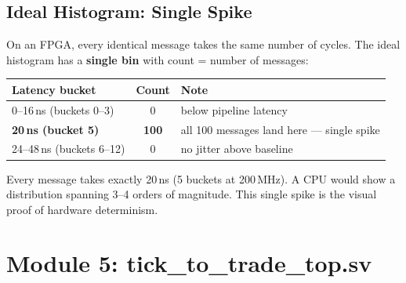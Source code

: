 \documentclass[11pt,a4paper]{article}
\begin{document}
\begin{center}
\end{center}

\subsection{Ideal Histogram: Single Spike}

On an FPGA, every identical message takes the same number of cycles.
The ideal histogram has a \textbf{single bin} with count = number of messages:

\begin{center}
\small
\begin{tabular}{l c l}
\toprule
\textbf{Latency bucket} & \textbf{Count} & \textbf{Note} \\
\midrule
0--16\,ns (buckets 0--3)   & 0   & below pipeline latency \\
\rowcolor{fpgalight}
\textbf{20\,ns (bucket 5)} & \textbf{100} & all 100 messages land here --- single spike \\
24--48\,ns (buckets 6--12) & 0   & no jitter above baseline \\
\bottomrule
\end{tabular}
\end{center}

\noindent Every message takes exactly 20\,ns (5 buckets at 200\,MHz).
A CPU would show a distribution spanning 3--4 orders of magnitude.
This single spike is the visual proof of hardware determinism.

\section{Module 5: tick\_to\_trade\_top.sv}
\end{document}
